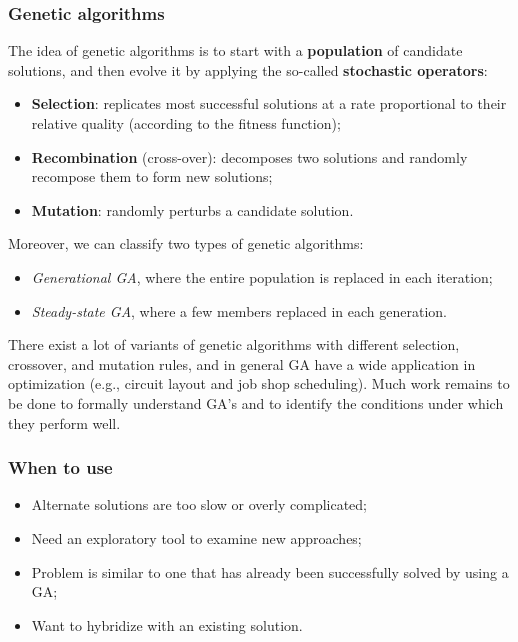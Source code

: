 \subsubsection{Genetic algorithms}
The idea of genetic algorithms is to start with a \textbf{population} of candidate solutions, and then evolve it by applying the so-called \textbf{stochastic operators}:

\begin{itemize}
    \item \textbf{Selection}: replicates most successful solutions at a rate proportional to their relative quality (according to the fitness function);
    \item \textbf{Recombination} (cross-over): decomposes two solutions and randomly recompose them to form new solutions;
    \item \textbf{Mutation}: randomly perturbs a candidate solution.
\end{itemize}


Moreover, we can classify two types of genetic algorithms:

\begin{itemize}
    \item \textit{Generational GA}, where the entire population is replaced in each iteration;
    \item \textit{Steady-state GA}, where a few members replaced in each generation.
\end{itemize}


There exist a lot of variants of genetic algorithms with different selection, crossover, and mutation rules, and in general GA have a wide application in optimization (e.g., circuit layout and job shop scheduling). Much work remains to be done to formally understand GA’s and to identify the conditions under which they perform well.

\subsubsection{When to use}
\begin{itemize}
    \item Alternate solutions are too slow or overly complicated;
    \item Need an exploratory tool to examine new approaches;
    \item Problem is similar to one that has already been successfully solved by using a GA;
    \item Want to hybridize with an existing solution.
\end{itemize}

